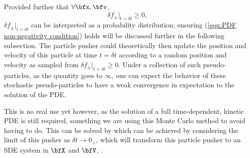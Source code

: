     Provided further that $\forall \bfx, \bfv$,
    \begin{equation}\label{eqn:PDF non-negativity condition}
        \delta\!f_{\pm}|_{t = \delta t}  \geq  0,
    \end{equation}
    $\delta\!f_{\pm}|_{t = \delta t}$ can be interpreted as a probability distribution; ensuring (\ref{eqn:PDF non-negativity condition}) holds will be discussed further in the following subsection. The particle pusher could theoretically then update the position and velocity of this particle at time $t  =  \delta t$ according to a random position and velocity as sampled from $\delta\!f_{\pm}|_{t = \delta t}  \geq  0$. Under a collection of such pseudo-particles, as the quantity goes to $\infty$, one can expect the behavior of these stochastic pseudo-particles to have a weak convergence in expectation to the solution of the PDE.

    This is no real use yet however, as the solution of a full time-dependent, kinetic PDE is still required, something we are using this Monte Carlo method to avoid having to do. This can be solved by which can be achieved by considering the limit of this pusher as $\delta t  \rightarrow  0_{+}$, which will transform this particle pusher to an SDE system in $\bfX$ and $\bfV$, .
    
